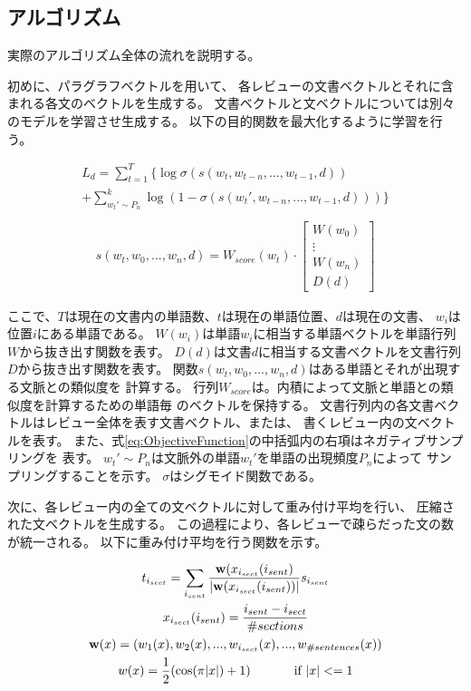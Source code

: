 \documentclass[twocolumn,a4paper]{ltjarticle}
\begin{document}
\subsection{アルゴリズム}

実際のアルゴリズム全体の流れを説明する。

初めに、パラグラフベクトルを用いて、
各レビューの文書ベクトルとそれに含まれる各文のベクトルを生成する。
文書ベクトルと文ベクトルについては別々のモデルを学習させ生成する。
以下の目的関数を最大化するように学習を行う。

\begin{multline}
  L_d = \sum^{T}_{t = 1} \{ \log \sigma(s(w_t, w_{t-n}, ..., w_{t-1}, d)) \\
        + \sum^{k}_{w_{t}' \sim P_n}
          \log(1 - \sigma(s(w_{t}', w_{t-n}, ..., w_{t-1}, d))) \}
  \label{eq:ObjectiveFunction} \\
\end{multline}
\begin{gather}
  s(w_t, w_0, ..., w_n, d)
    = W_{score}(w_t)
      \cdot \begin{bmatrix} W(w_0) \\ \vdots \\ W(w_n) \\ D(d) \end{bmatrix}
\end{gather}

ここで、$T$は現在の文書内の単語数、$t$は現在の単語位置、$d$は現在の文書、
$w_i$は位置$i$にある単語である。
$W(w_i)$は単語$w_i$に相当する単語ベクトルを単語行列$W$から抜き出す関数を表す。
$D(d)$は文書$d$に相当する文書ベクトルを文書行列$D$から抜き出す関数を表す。
関数$s(w_t, w_0, ..., w_n, d)$はある単語とそれが出現する文脈との類似度を
計算する。
行列$W_{score}$は。内積によって文脈と単語との類似度を計算するための単語毎
のベクトルを保持する。
文書行列内の各文書ベクトルはレビュー全体を表す文書ベクトル、または、
書くレビュー内の文ベクトルを表す。
また、式\ref{eq:ObjectiveFunction}の中括弧内の右項はネガティブサンプリングを
表す。
$w_{t}' \sim P_n$は文脈外の単語$w_{t}'$を単語の出現頻度$P_n$によって
サンプリングすることを示す。
$\sigma$はシグモイド関数である。

次に、各レビュー内の全ての文ベクトルに対して重み付け平均を行い、
圧縮された文ベクトルを生成する。
この過程により、各レビューで疎らだった文の数が統一される。
以下に重み付け平均を行う関数を示す。

\begin{gather}
  t_{i_{sect}} = \sum_{i_{sent}} \frac{\mathbf{w}(x_{i_{sect}}(i_{sent})}
                                      {|\mathbf{w}(x_{i_{sect}}(i_{sent}))|}
                                 s_{i_{sent}} \\
  x_{i_{sect}}(i_{sent}) = \frac{i_{sent} - i_{sect}}{\#sections} \\
  \mathbf{w}(x) = (w_{1}(x), w_{2}(x), ..., w_{i_{sect}}(x),
                   ..., w_{\#sentences}(x)) \\
  w(x) = \frac{1}{2} (\cos(\pi|x|) + 1) \hspace{8ex} \text{if $|x| <= 1$}
\end{gather}
\end{document}
